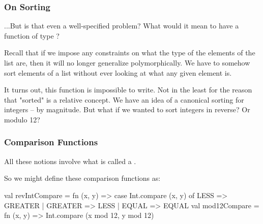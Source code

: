 \documentclass[aspectratio=169, handout]{beamer}
\begin{document}
\begin{frame}[fragile]
  \frametitle{On Sorting}

  ...But is that even a well-specified problem? What would it mean to have a function of
  type ?

  \pause
  \vspace{\fill}

  Recall that if we impose any constraints on what the type of the elements of the list are,
  then it will no longer generalize polymorphically. We have to somehow sort elements of a
  list without ever looking at what any given element is.

  \pause
  \vspace{\fill}

  It turns out, this function is impossible to write. Not in the least for the reason that
  "sorted" is a relative concept. We have an idea of a canonical sorting for integers --
  by magnitude. But what if we wanted to sort integers in reverse? Or modulo 12?
\end{frame}

\begin{frame}[fragile]
  \frametitle{Comparison Functions}

  All these notions involve what is called a .

  \pause
  \vspace{\fill}


  \pause
  \vspace{\fill}


  \pause
  \vspace{\fill}

  So we might define these comparison functions as:

  \begin{codeblock}
    val revIntCompare =
      fn (x, y) => case Int.compare (x, y) of
                     LESS => GREATER
                   | GREATER => LESS
                   | EQUAL => EQUAL
    val mod12Compare =
      fn (x, y) => Int.compare (x mod 12, y mod 12)
  \end{codeblock}
\end{frame}
\end{document}
